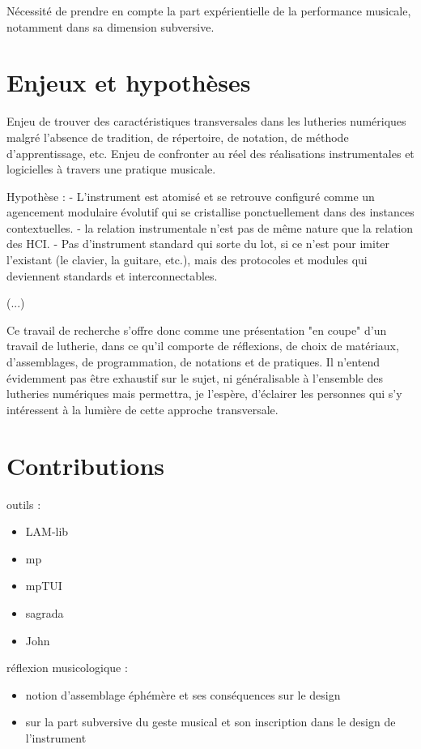 Nécessité de prendre en compte la part expérientielle de la performance musicale, notamment dans sa dimension subversive.

\section{Enjeux et hypothèses}

Enjeu de trouver des caractéristiques transversales dans les lutheries numériques malgré l'absence de tradition, de répertoire, de notation, de méthode d'apprentissage, etc.
Enjeu de confronter au réel des réalisations instrumentales et logicielles à travers une pratique musicale.

Hypothèse :
- L'instrument est atomisé et se retrouve configuré comme un agencement modulaire évolutif qui se cristallise ponctuellement dans des instances contextuelles.
- la relation instrumentale n'est pas de même nature que la relation des HCI.
- Pas d'instrument standard qui sorte du lot, si ce n'est pour imiter l'existant (le clavier, la guitare, etc.), mais des protocoles et modules qui deviennent standards et interconnectables.

(...)

%
Ce travail de recherche s'offre donc comme une présentation "en coupe" d'un travail de lutherie, dans ce qu'il comporte de réflexions, de choix de matériaux, d'assemblages, de programmation, de notations et de pratiques. Il n'entend évidemment pas être exhaustif sur le sujet, ni généralisable à l'ensemble des lutheries numériques mais permettra, je l'espère, d'éclairer les personnes qui s'y intéressent à la lumière de cette approche transversale.
%


\section{Contributions}

outils :
\vspace{-1em}
\begin{itemize}[noitemsep]
\item LAM-lib
\item mp
\item mpTUI
\item sagrada
\item John
\end{itemize}


réflexion musicologique : 
\vspace{-1em}
\begin{itemize}[noitemsep]
\item notion d'assemblage éphémère et ses conséquences sur le design
\item sur la part subversive du geste musical et son inscription dans le design de l'instrument
\end{itemize}



